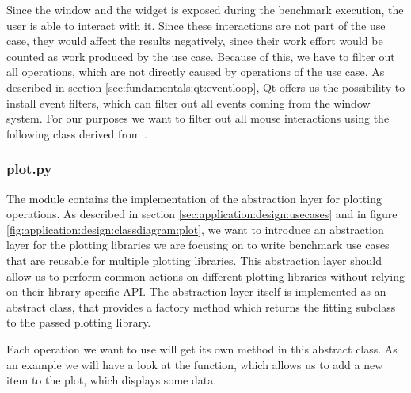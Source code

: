 

Since the window and the widget is exposed during the benchmark execution, the
user is able to interact with it. Since these interactions are not part of the
use case, they would affect the results negatively, since their work effort
would be counted as work produced by the use case. Because of this, we have to
filter out all operations, which are not directly caused by operations of the
use case. As described in section \ref{sec:fundamentals:qt:eventloop}, Qt offers
us the possibility to install event filters, which can filter out all events
coming from the window system. For our purposes we want to filter out all mouse
interactions using the following class derived from
.



\subsubsection*{plot.py}

The module  contains the implementation
of the abstraction layer for plotting operations.  As described in section
\ref{sec:application:design:usecases} and in figure
\ref{fig:application:design:classdiagram:plot}, we want to introduce an
abstraction layer for the plotting libraries we are focusing on to write
benchmark use cases that are reusable for multiple plotting libraries.  This
abstraction layer should allow us to perform common actions on different
plotting libraries without relying on their library specific API. The
abstraction layer itself is implemented as an abstract class, that provides a
factory method which returns the fitting subclass to the passed plotting
library.



Each operation we want to use will get its own method in this abstract class. As
an example we will have a look at the  function,
which allows us to add a new item to the plot, which displays some data.



